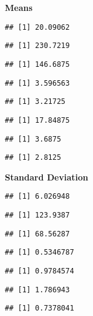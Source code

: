 \documentclass[
]{article}
\begin{document}
\textbf{Means}

\begin{verbatim}
## [1] 20.09062
\end{verbatim}

\begin{verbatim}
## [1] 230.7219
\end{verbatim}

\begin{verbatim}
## [1] 146.6875
\end{verbatim}

\begin{verbatim}
## [1] 3.596563
\end{verbatim}

\begin{verbatim}
## [1] 3.21725
\end{verbatim}

\begin{verbatim}
## [1] 17.84875
\end{verbatim}

\begin{verbatim}
## [1] 3.6875
\end{verbatim}

\begin{verbatim}
## [1] 2.8125
\end{verbatim}

\textbf{Standard Deviation}

\begin{verbatim}
## [1] 6.026948
\end{verbatim}

\begin{verbatim}
## [1] 123.9387
\end{verbatim}

\begin{verbatim}
## [1] 68.56287
\end{verbatim}

\begin{verbatim}
## [1] 0.5346787
\end{verbatim}

\begin{verbatim}
## [1] 0.9784574
\end{verbatim}

\begin{verbatim}
## [1] 1.786943
\end{verbatim}

\begin{verbatim}
## [1] 0.7378041
\end{verbatim}
\end{document}
